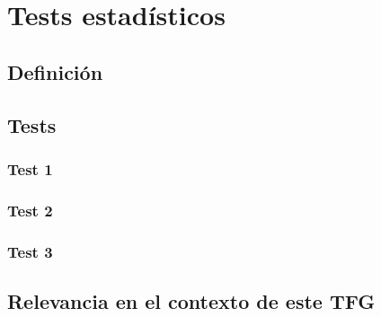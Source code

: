 
\chapter{Tests estadísticos}

\section{Definición}

\section{Tests}
\subsection{Test 1}
\subsection{Test 2}
\subsection{Test 3}

\section{Relevancia en el contexto de este TFG}

\endinput
